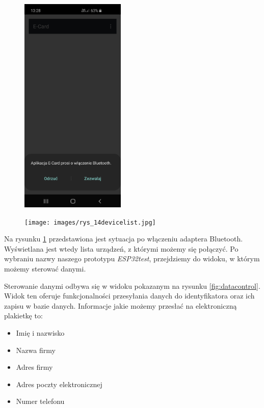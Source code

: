 \documentclass[a4paper,12pt, twoside]{article}
\begin{document}
    	\begin{figure}[H]
    	\vspace{.5cm}
    	\centering
    	\begin{minipage}{.5\textwidth}
    	    \centering
    	    \includegraphics[width=5cm]{images/rys_13bluetoothdialog.jpg}
            \label{fig:bton}
        \end{minipage}%
        \begin{minipage}{.5\textwidth}
            \centering
    	    \texttt{[image: images/rys\_14devicelist.jpg]}
            \label{fig:btdevices}
        \end{minipage}
        \vspace{.5cm}
    	\end{figure}
    	
    	Na rysunku \ref{fig:btdevices} przedstawiona jest sytuacja po włączeniu adaptera Bluetooth. Wyświetlana jest wtedy lista urządzeń, z którymi możemy się połączyć. Po wybraniu nazwy naszego prototypu \textit{ESP32test}, przejdziemy do widoku, w którym możemy sterować danymi.
    	
    	\newpage
    	\vspace{1cm}
    	Sterowanie danymi odbywa się w widoku pokazanym na rysunku \ref{fig:datacontrol}. Widok ten oferuje funkcjonalności przesyłania danych do identyfikatora oraz ich zapisu w bazie danych. Informacje jakie możemy przesłać na elektroniczną plakietkę to:
    	\begin{itemize}
    	    \item Imię i nazwisko
    	    \item Nazwa firmy
    	    \item Adres firmy
    	    \item Adres poczty elektronicznej
    	    \item Numer telefonu
    	\end{itemize}
    	
\end{document}
